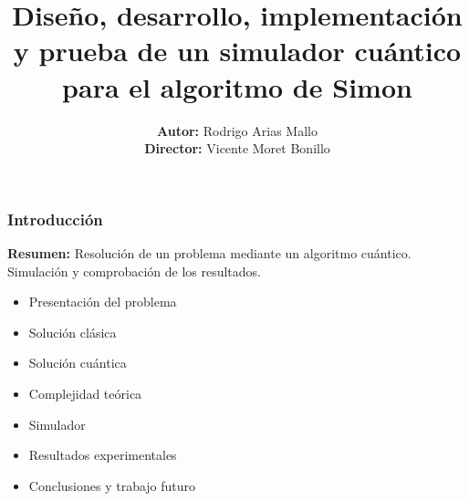 
\title{Diseño, desarrollo, implementación y prueba de un simulador cuántico para 
el algoritmo de Simon}

\author{\textbf{Autor:} Rodrigo Arias Mallo \\
\textbf{Director:} Vicente Moret Bonillo}







\frame{\titlepage}


\begin{frame}
\frametitle{Introducción}

\textbf{Resumen:} Resolución de un problema mediante un algoritmo cuántico.  
Simulación y comprobación de los resultados.

\tableofcontents
\begin{itemize}
\item Presentación del problema
\item Solución clásica
\item Solución cuántica
\item Complejidad teórica
\item Simulador
\item Resultados experimentales
\item Conclusiones y trabajo futuro
\end{itemize}

\end{frame}


